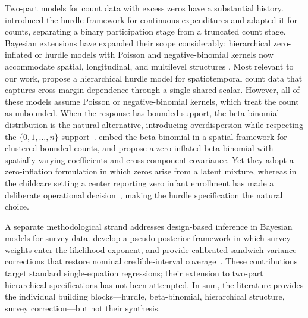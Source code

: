 
Two-part models for count data with excess zeros have a substantial
history.  \citet{Cragg1971} introduced the hurdle framework for
continuous expenditures and \citet{Mullahy1986} adapted it for counts,
separating a binary participation stage from a truncated count stage.
Bayesian extensions have expanded their scope considerably: hierarchical
zero-inflated or hurdle models with Poisson and negative-binomial kernels
now accommodate spatial, longitudinal, and multilevel structures
\citep{NeelonEtAl2010, NeelonEtAl2013, NeelonEtAl2016, Neelon2019,
Altinisik2023}.  Most relevant to our work, \citet{GhosalEtAl2020}
propose a hierarchical hurdle model for spatiotemporal count data that
captures cross-margin dependence through a single shared scalar.  However,
all of these models assume Poisson or negative-binomial kernels, which
treat the count as unbounded.  When the response has bounded support, the
beta-binomial distribution is the natural alternative, introducing
overdispersion while respecting the $\{0,1,\ldots,n\}$
support~\citep{WagnerEtAl2015}.  \citet{BandyopadhyayEtAl2011} embed the
beta-binomial in a spatial framework for clustered bounded counts, and
\citet{WenEtAl2025} propose a zero-inflated beta-binomial with spatially
varying coefficients and cross-component covariance.  Yet they adopt a
zero-inflation formulation in which zeros arise from a latent mixture,
whereas in the childcare setting a center reporting zero infant enrollment
has made a deliberate operational decision~\citep[cf.][]{Lambert1992,
Hall2000}, making the hurdle specification the natural choice.


A separate methodological strand addresses design-based inference in
Bayesian models for survey data.  \citet{SavitskyToth2016} develop a
pseudo-posterior framework in which survey weights enter the likelihood
exponent, and \citet{WilliamsSavitsky2021} provide calibrated sandwich
variance corrections that restore nominal credible-interval
coverage~\citep[building on][]{Binder1983, Pfeffermann1993}.  These
contributions target standard single-equation regressions; their
extension to two-part hierarchical specifications has not been attempted.
In sum, the literature provides the individual building
blocks---hurdle, beta-binomial, hierarchical structure, survey
correction---but not their synthesis.

